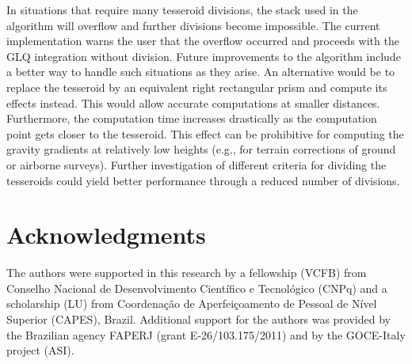 \documentclass[manuscript,endfloat]{geophysics}
\begin{document}
In situations that require many tesseroid divisions,
the stack used in the algorithm will overflow and further
divisions become impossible.
The current implementation warns the user that
the overflow occurred and proceeds with the GLQ integration without division.
Future improvements to the algorithm include a better way to handle such
situations as they arise.
An alternative would be to replace the tesseroid by an equivalent
right rectangular prism and compute its effects instead.
This would allow accurate computations at smaller distances.
Furthermore,
the computation time increases drastically as the computation point
gets closer to the tesseroid.
This effect can be prohibitive for computing the gravity gradients at
relatively low heights (e.g., for terrain corrections of
ground or airborne surveys).
Further investigation of different criteria for dividing the tesseroids could
yield better performance through a reduced number of divisions.


\section{Acknowledgments}

The authors were supported in this research by
a fellowship (VCFB) from
Conselho Nacional de Desenvolvimento Cient\'ifico e Tecnol\'ogico (CNPq)
and a scholarship (LU) from
Coordena\c{c}\~ao de Aperfei\c{c}oamento de Pessoal de N\'ivel Superior
(CAPES),
Brazil.
Additional support for the authors was provided by
the Brazilian agency FAPERJ (grant E-26/103.175/2011)
and by the GOCE-Italy project (ASI).



\end{document}
